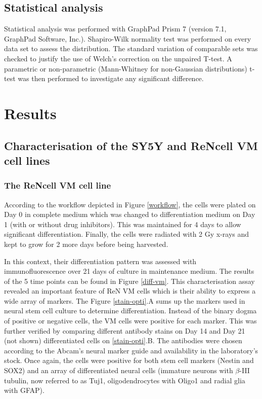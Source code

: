 \documentclass[onecolumn,10pt]{asme2ej}
\begin{document}
\subsection{Statistical analysis}
Statistical analysis was performed with GraphPad Prism 7 (version 7.1, GraphPad Software, Inc.). Shapiro-Wilk normality test was performed on every data set to assess the distribution. The standard variation of comparable sets was checked to justify the use of Welch's correction on the unpaired T-test. A parametric or non-parametric (Mann-Whitney for non-Gaussian distributions) t-test was then performed to investigate any significant difference.  


\section{Results}
\subsection{Characterisation of the SY5Y and ReNcell VM cell lines}
\subsubsection{The ReNcell VM cell line}
According to the workflow depicted in Figure \ref*{workflow},  the cells were plated on Day 0 in complete medium which was changed to differentiation medium on Day 1 (with or without drug inhibitors). This was maintained for 4 days to allow significant differentiation. Finally, the cells were radiated with 2 Gy x-rays and kept to grow for 2 more days before being harvested.  

In this context, their differentiation pattern was assessed with immunofluorescence over 21 days of culture in maintenance medium. 
 The results of the 5 time points can be found in Figure \ref{diff-vm}. This characterisation assay revealed an important feature of ReN VM cells which is their ability to express a wide array of markers. The Figure \ref*{stain-opti}.A sums up the markers used in neural stem cell culture to determine differentiation. Instead of the binary dogma of positive or negative cells, the VM cells were positive for each marker. This was further verified by comparing different antibody stains on Day 14 and Day 21 (not shown) differentiated cells on \ref*{stain-opti}.B. The antibodies were chosen according to the Abcam's neural marker guide and availability in the laboratory's stock. Once again, the cells were positive for both stem cell markers (Nestin and SOX2) and an array of differentiated neural cells (immature neurons with $\beta$-III tubulin, now referred to as Tuj1, oligodendrocytes with Oligo1 and radial glia with GFAP).
\end{document}
